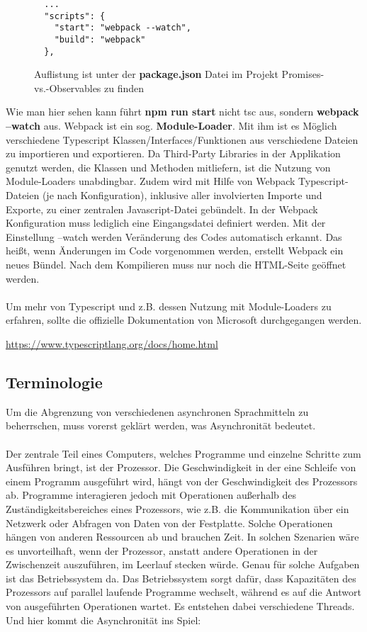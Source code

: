\begin{figure}[H]
\begin{lstlisting}
  ...
  "scripts": {
    "start": "webpack --watch",
    "build": "webpack"
  }, 
\end{lstlisting}
\caption{Auflistung ist unter der \textbf{package.json} Datei im Projekt Promises-vs.-Observables zu finden}
\end{figure}

\noindent
Wie man hier sehen kann führt \textbf{npm run start} nicht tsc aus, sondern \textbf{webpack --watch} aus. Webpack ist ein sog. \textbf{Module-Loader}. Mit ihm ist es Möglich verschiedene Typescript Klassen/Interfaces/Funktionen aus verschiedene Dateien zu importieren und exportieren. Da Third-Party Libraries in der Applikation genutzt werden, die Klassen und Methoden mitliefern, ist die Nutzung von Module-Loaders unabdingbar. Zudem wird mit Hilfe von Webpack Typescript-Dateien (je nach Konfiguration), inklusive aller involvierten Importe und Exporte, zu einer zentralen Javascript-Datei gebündelt. In der Webpack Konfiguration muss lediglich eine Eingangsdatei definiert werden. Mit der Einstellung --watch werden Veränderung des Codes automatisch erkannt. Das heißt, wenn Änderungen im Code vorgenommen werden, erstellt Webpack ein neues Bündel. Nach dem Kompilieren muss nur noch die HTML-Seite geöffnet werden.\\\\

\noindent
Um mehr von Typescript und z.B. dessen Nutzung mit Module-Loaders zu erfahren, sollte die offizielle Dokumentation von Microsoft durchgegangen werden.

\begin{center}
\url{https://www.typescriptlang.org/docs/home.html} 
\end{center}

\subsection{Terminologie}

Um die Abgrenzung von verschiedenen asynchronen Sprachmitteln zu beherrschen, muss vorerst geklärt werden, was Asynchronität bedeutet.\\\\
\noindent
Der zentrale Teil eines Computers, welches Programme und einzelne Schritte zum Ausführen bringt, ist der Prozessor. Die Geschwindigkeit in der eine Schleife von einem Programm ausgeführt wird, hängt von der Geschwindigkeit des Prozessors ab. Programme interagieren jedoch mit Operationen außerhalb des Zuständigkeitsbereiches eines Prozessors, wie z.B. die Kommunikation über ein Netzwerk oder Abfragen von Daten von der Festplatte. Solche Operationen hängen von anderen Ressourcen ab und brauchen Zeit. In solchen Szenarien wäre es unvorteilhaft, wenn der Prozessor, anstatt andere Operationen in der Zwischenzeit auszuführen, im Leerlauf stecken würde. Genau für solche Aufgaben ist das Betriebssystem da. Das Betriebssystem sorgt dafür, dass Kapazitäten des Prozessors auf parallel laufende Programme wechselt, während es auf die Antwort von ausgeführten Operationen wartet. Es entstehen dabei verschiedene \glqq Threads\grqq{}. Und hier kommt die Asynchronität ins Spiel:

